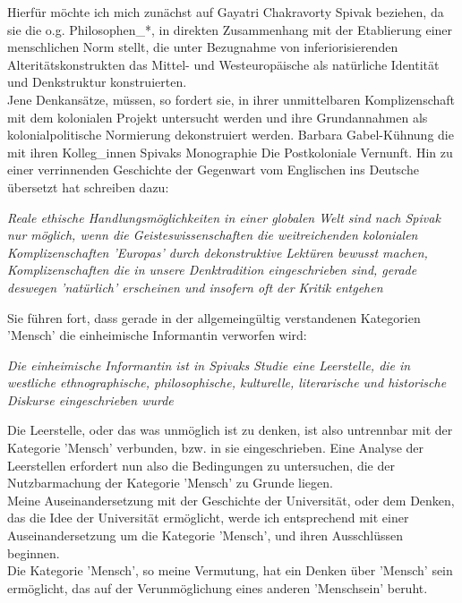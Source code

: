 \noindent Hierfür möchte ich mich zunächst auf Gayatri Chakravorty Spivak beziehen, da
sie die o.g. Philosophen\_*, in direkten Zusammenhang mit der Etablierung einer
\glqq menschlichen Norm \grqq \footnotemark {}
stellt, die unter Bezugnahme von \glqq inferiorisierenden Alteritätskonstrukten
\grqq das Mittel- und Westeuropäische als natürliche Identität und Denkstruktur
konstruierten.\\
Jene Denkansätze, müssen, so fordert sie, in ihrer unmittelbaren
Komplizenschaft mit dem kolonialen Projekt untersucht werden und ihre
Grundannahmen als kolonialpolitische Normierung dekonstruiert werden.
\footnotemark {}
Barbara Gabel-Kühnung die mit ihren Kolleg\_innen Spivaks Monographie \glqq Die Postkoloniale Vernunft. Hin zu einer verrinnenden
Geschichte der Gegenwart \grqq \footnotemark {} vom Englischen ins Deutsche übersetzt hat schreiben dazu: 
\begin{myenv} 
  \textit{ \glqq Reale ethische
  Handlungsmöglichkeiten in einer globalen Welt sind nach Spivak nur möglich,
wenn die Geisteswissenschaften die weitreichenden kolonialen Komplizenschaften
'Europas' durch dekonstruktive Lektüren bewusst machen, Komplizenschaften die
in unsere Denktradition eingeschrieben sind, gerade deswegen 'natürlich'
erscheinen und insofern oft der Kritik entgehen \grqq \footnotemark
{}} 
\end{myenv} 
Sie führen fort, dass gerade in der allgemeingültig verstandenen Kategorien 'Mensch' die
\glqq einheimische Informantin \grqq verworfen wird:
\begin{myenv} \textit{
    \glqq Die einheimische Informantin ist in Spivaks Studie eine Leerstelle,
die in westliche ethnographische, philosophische, kulturelle, literarische und
historische Diskurse eingeschrieben wurde \grqq \footnotemark {}} 
\end{myenv}
Die Leerstelle, oder das was unmöglich ist zu denken, ist also untrennbar mit
der Kategorie 'Mensch' verbunden, bzw. in sie eingeschrieben. Eine Analyse der
Leerstellen erfordert nun also die Bedingungen zu untersuchen, die der
Nutzbarmachung der Kategorie 'Mensch' zu Grunde liegen. \\
Meine Auseinandersetzung mit
der Geschichte der Universität, oder dem Denken, das die Idee der Universität
ermöglicht, werde ich entsprechend mit einer Auseinandersetzung um die
Kategorie 'Mensch', und ihren Ausschlüssen beginnen.\\
Die Kategorie 'Mensch', so
meine Vermutung, hat ein Denken über 'Mensch' sein ermöglicht, das auf der
Verunmöglichung eines anderen 'Menschsein' beruht.\\

